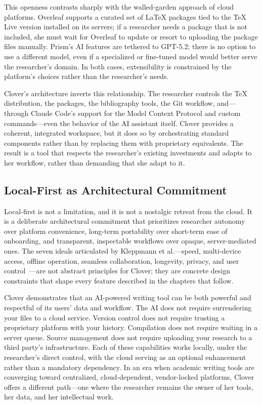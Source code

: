 \documentclass[a4paper,11pt]{article}
\begin{document}
This openness contrasts sharply with the walled-garden approach of cloud platforms. Overleaf supports a curated set of \LaTeX{} packages tied to the TeX Live version installed on its servers; if a researcher needs a package that is not included, she must wait for Overleaf to update or resort to uploading the package files manually. Prism's AI features are tethered to GPT-5.2; there is no option to use a different model, even if a specialized or fine-tuned model would better serve the researcher's domain. In both cases, extensibility is constrained by the platform's choices rather than the researcher's needs.

Clover's architecture inverts this relationship. The researcher controls the TeX distribution, the packages, the bibliography tools, the Git workflow, and---through Claude Code's support for the Model Context Protocol and custom commands---even the behavior of the AI assistant itself. Clover provides a coherent, integrated workspace, but it does so by orchestrating standard components rather than by replacing them with proprietary equivalents. The result is a tool that respects the researcher's existing investments and adapts to her workflow, rather than demanding that she adapt to it.

\subsection{Local-First as Architectural Commitment}

Local-first is not a limitation, and it is not a nostalgic retreat from the cloud. It is a deliberate architectural commitment that prioritizes researcher autonomy over platform convenience, long-term portability over short-term ease of onboarding, and transparent, inspectable workflows over opaque, server-mediated ones. The seven ideals articulated by Kleppmann et al.---speed, multi-device access, offline operation, seamless collaboration, longevity, privacy, and user control~\cite{Kleppmann2019LocalFirst}---are not abstract principles for Clover; they are concrete design constraints that shape every feature described in the chapters that follow.

Clover demonstrates that an AI-powered writing tool can be both powerful and respectful of its users' data and workflow. The AI does not require surrendering your files to a cloud service. Version control does not require trusting a proprietary platform with your history. Compilation does not require waiting in a server queue. Source management does not require uploading your research to a third party's infrastructure. Each of these capabilities works locally, under the researcher's direct control, with the cloud serving as an optional enhancement rather than a mandatory dependency. In an era when academic writing tools are converging toward centralized, cloud-dependent, vendor-locked platforms, Clover offers a different path---one where the researcher remains the owner of her tools, her data, and her intellectual work.
\end{document}
